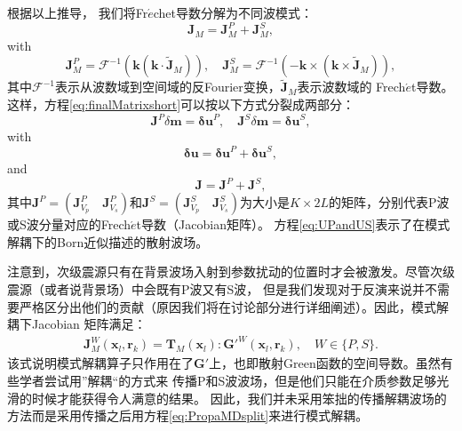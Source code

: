 根据以上推导， 我们将Fr{$\acute{e}$}chet导数分解为不同波模式：
\begin{equation}
        {\mathbf J}_M={\mathbf J}^P_M+{\mathbf J}^S_M,
\label{eq:PropaMDall}
\end{equation}
with
\begin{equation}
        {\mathbf J}^P_M=\mathcal{F}^{-1}(\mathbf k(\mathbf k\cdot \tilde{\mathbf
        J}_M)), \quad
        {\mathbf J}^S_M=\mathcal{F}^{-1}(-\mathbf
                k\times(\mathbf k\times \tilde{\mathbf J}_M)),
\label{eq:PropaMDsplit}
\end{equation}
其中$\mathcal{F}^{-1}$表示从波数域到空间域的反Fourier变换，$\tilde{\mathbf{J}}_M$表示波数域的 Frech{$\acute{e}$}t导数。
这样，方程\eqref{eq:finalMatrixshort}可以按以下方式分裂成两部分：
\begin{equation}
        \mathbf{J}^P\delta\mathbf{m}=\mathbf{\delta u}^P,\quad
        \mathbf{J}^S\delta\mathbf{m}=\mathbf{\delta u}^S,
        \label{eq:UPandUS}
\end{equation}
with
\begin{equation}
        \mathbf{\delta u}=\mathbf{\delta u}^P+\mathbf{\delta u}^S,
        \label{eq:UPS}
\end{equation}
and
\begin{equation}
        \mathbf{J}=\mathbf{J}^P+\mathbf{J}^S,
        \label{eq:JPS}
\end{equation}
其中$\mathbf{J}^P=(\mathbf{J}^P_{V_p}\quad\mathbf{J}^P_{V_s})$和$\mathbf{J}^S=(\mathbf{J}^S_{V_p}\quad\mathbf{J}^S_{V_s})$为大小是$K\times{2L}$的矩阵，分别代表P波或S波分量对应的Frech{$\acute{e}$}t导数（Jacobian矩阵）。
方程\eqref{eq:UPandUS}表示了在模式解耦下的Born近似描述的散射波场。

注意到，次级震源只有在背景波场入射到参数扰动的位置时才会被激发。尽管次级震源（或者说背景场）中会既有P波又有S波，
但是我们发现对于反演来说并不需要严格区分出他们的贡献（原因我们将在讨论部分进行详细阐述）。因此，模式解耦下Jacobian
矩阵满足：
\begin{equation}
        \begin{split} 
        \mathbf{J}^W_M(\mathbf{x}_l,\mathbf{r}_k)=
        \mathbf{T}_M(\mathbf{x}_l):\mathbf{G}'^W(\mathbf{x}_l,\mathbf{r}_k),\quad
        W\in\{P, S\}.
        \end{split}
        \label{eq:EquivFre1}
\end{equation}
该式说明模式解耦算子只作用在了$\mathbf{G}'$上，也即散射Green函数的空间导数。虽然有些学者尝试用”解耦“的方式来
传播P和S波波场\cite{ma.zhu:2003,cheng:2016}，但是他们只能在介质参数足够光滑的时候才能获得令人满意的结果\cite[]{brytik:2011,wang.mcmechan:2015b}。
因此，我们并未采用笨拙的传播解耦波场的方法而是采用传播之后用方程\eqref{eq:PropaMDsplit}来进行模式解耦。

